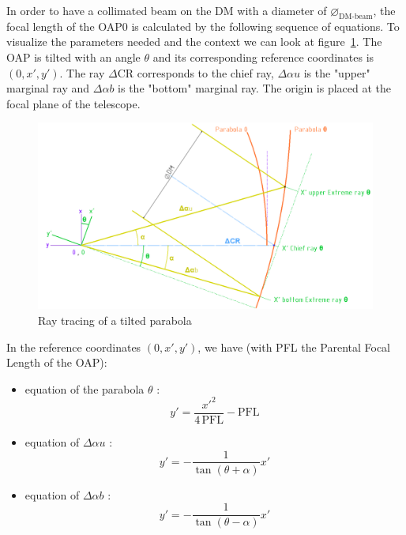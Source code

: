 \documentclass[12pt,a4paper]{article}
\begin{document}
In order to have a collimated beam on the DM with a diameter of $\diameter_{\text{DM-beam}}$, the focal length of the OAP0 is calculated by the following sequence of equations. To visualize the parameters needed and the context we can look at figure~\ref{fig:sketch_ray_tracing_OAP0}. The OAP is tilted with an angle $\theta$ and its corresponding reference coordinates is $\left(0,x',y'\right)$. The ray $\Delta$CR corresponds to the chief ray, $\Delta\alpha u$ is the "upper" marginal ray and $\Delta\alpha b$ is the "bottom" marginal ray. The origin is placed at the focal plane of the telescope.

\begin{figure}[H]
	\begin{center}
		\includegraphics[width=.8\textwidth]{images/sketch_ray_tracing_OAP0.PNG}
		\caption{Ray tracing of a tilted parabola}\label{fig:sketch_ray_tracing_OAP0}
	\end{center}
\end{figure}
In the reference coordinates $\left(0,x',y'\right)$, we have (with PFL the Parental Focal Length of the OAP):
\begin{itemize}
	\item equation of the parabola $\theta$ : 
	\begin{equation}
	y' = \frac{x'^2}{4\,\text{PFL}}-\text{PFL}	\label{eq:parabola_theta}
	\end{equation}
	\item equation of $\Delta\alpha u$ : \begin{equation}
	y' = -\frac{1}{\tan\left(\theta+\alpha\right)}x' \label{eq:delta_alphau}
	\end{equation}
	\item equation of $\Delta\alpha b$ : \begin{equation}
	y' = -\frac{1}{\tan\left(\theta-\alpha\right)}x' \label{eq:delta_alphab}
	\end{equation}
\end{itemize}
%
\end{document}
